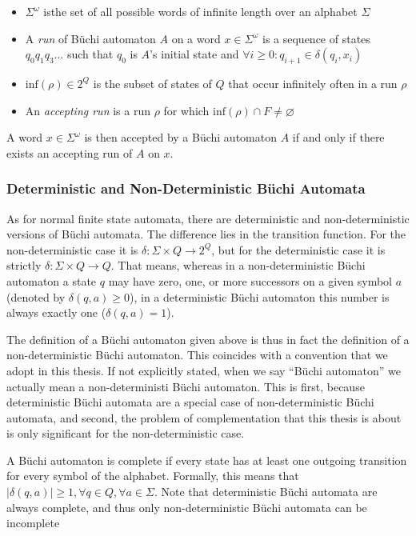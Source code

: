 \documentclass{scrreprt}
\begin{document}
\begin{itemize}
\item $\Sigma^\omega$ isthe set of all possible words of infinite length over an alphabet $\Sigma$
\item A \emph{run} of Büchi automaton $A$ on a word $x \in \Sigma^\omega$ is a sequence of states $q_0q_1q_3\dots$ such that $q_0$ is $A$'s initial state and $\forall i \geq 0: q_{i+1} \in \delta(q_i, x_i)$
\item $\textrm{inf}(\rho) \in 2^Q$ is the subset of states of $Q$ that occur infinitely often in a run $\rho$
\item An \emph{accepting run} is a run $\rho$ for which $\textrm{inf}(\rho) \cap F \neq \varnothing$  
\end{itemize}

A word $x \in \Sigma^\omega$ is then accepted by a Büchi automaton $A$ if and only if there exists an accepting run of $A$ on $x$.

\subsubsection{Deterministic and Non-Deterministic Büchi Automata}
As for normal finite state automata, there are deterministic and non-deterministic versions of Büchi automata. The difference lies in the transition function. For the non-deterministic case it is $\delta: \Sigma \times Q \rightarrow 2^Q$, but for the deterministic case it is strictly $\delta: \Sigma \times Q \rightarrow Q$. That means, whereas in a non-deterministic Büchi automaton a state $q$ may have zero, one, or more successors on a given symbol $a$ (denoted by $\delta(q,a) \geq 0$), in a deterministic Büchi automaton this number is always exactly one ($\delta(q,a) = 1$).

The definition of a Büchi automaton given above is thus in fact the definition of a non-deterministic Büchi automaton. This coincides with a convention that we adopt in this thesis. If not explicitly stated, when we say ``Büchi automaton'' we actually mean a non-deterministi Büchi automaton. This is first, because deterministic Büchi automata are a special case of non-deterministic Büchi automata, and second, the problem of complementation that this thesis is about is only significant for the non-deterministic case.

A Büchi automaton is complete if every state has at least one outgoing transition for every symbol of the alphabet. Formally, this means that $|\delta(q,a)| \geq 1, \forall q \in Q, \forall a \in \Sigma$. Note that deterministic Büchi automata are always complete, and thus only non-deterministic Büchi automata can be incomplete
\end{document}

